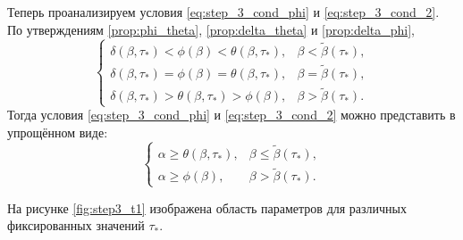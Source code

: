 Теперь проанализируем условия \eqref{eq:step_3_cond_phi} и \eqref{eq:step_3_cond_2}. По утверждениям \ref{prop:phi_theta}, \ref{prop:delta_theta} и \ref{prop:delta_phi},
\begin{equation}
	\begin{cases}
		\delta(\beta, \tau_*) < \phi(\beta) < \theta(\beta, \tau_*), & \beta < \tilde{\beta}(\tau_*),\\
		\delta(\beta, \tau_*) = \phi(\beta) = \theta(\beta, \tau_*), & \beta = \tilde{\beta}(\tau_*),\\
		\delta(\beta, \tau_*) > \theta(\beta, \tau_*) > \phi(\beta), & \beta > \tilde{\beta}(\tau_*).
	\end{cases}
\end{equation}
%
Тогда условия \eqref{eq:step_3_cond_phi} и \eqref{eq:step_3_cond_2} можно представить в упрощённом виде:
\begin{equation}
	\label{eq:phi_theta_cond}
	\begin{cases}
		\alpha \geq \theta(\beta, \tau_*), & \beta \leq \tilde{\beta}(\tau_*),\\
		\alpha \geq \phi(\beta), & \beta > \tilde{\beta}(\tau_*).
	\end{cases}
\end{equation}


На рисунке \ref{fig:step3_t1} изображена область параметров для различных фиксированных значений $\tau_*$.

